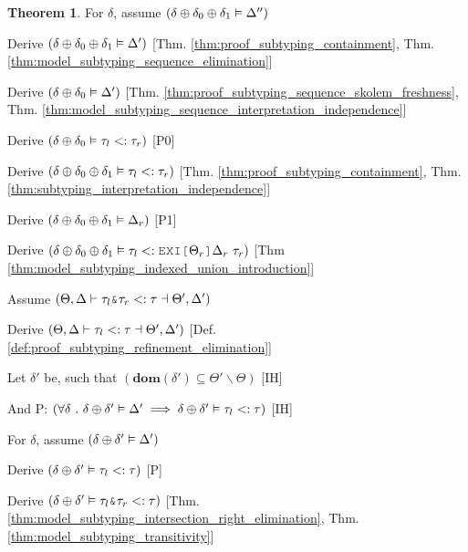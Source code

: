\documentclass[acmsmall]{acmart}
\theoremstyle{definition}
\newtheorem{theorem}{Theorem}[section]
\begin{document}
\begin{theorem}
  \item \I \N For $\delta$, assume $(
    \delta \oplus \delta_0 \oplus \delta_1 \vDash \Delta''
  )$


  \item \I\I \N Derive $(
    \delta \oplus \delta_0 \oplus \delta_1 \vDash \Delta'
  )$ [Thm. \ref{thm:proof_subtyping_containment}, Thm. \ref{thm:model_subtyping_sequence_elimination}]
  \item \I\I \N Derive $(
    \delta \oplus \delta_0 \vDash \Delta'
  )$ [Thm. \ref{thm:proof_subtyping_sequence_skolem_freshness}, Thm. \ref{thm:model_subtyping_sequence_interpretation_independence}]
  \item \I\I \N Derive $(
    \delta \oplus \delta_0 \vDash \tau_l <: \tau_r
  )$ [P0]


  \item \I\I \N Derive $(
    \delta \oplus \delta_0 \oplus \delta_1 \vDash \tau_l <: \tau_r
  )$ [Thm. \ref{thm:proof_subtyping_containment}, Thm. \ref{thm:subtyping_interpretation_independence}]


  \item \I\I \N Derive $(
    \delta \oplus \delta_0 \oplus \delta_1 \vDash \Delta_r
  )$ [P1]

  \item \I\I \N Derive $(
    \delta \oplus \delta_0 \oplus \delta_1 \satisfies \tau_l \subtypes \J{EXI[}\Theta_r\J{]}\Delta_r\ \tau_r
  )$ [Thm \ref{thm:model_subtyping_indexed_union_introduction}]


  \item \N Assume $(
    \Theta, \Delta \entails \tau_{l}\J{\&}\tau_{r}  \subtypes \tau \given \Theta', \Delta' 
  )$
  \item \I \N Derive $(
    \Theta, \Delta \vdash \tau_{l} <: \tau \dashv \Theta', \Delta'
  )$ [Def. \ref{def:proof_subtyping_refinement_elimination}]

  \item \I \N Let $\delta'$ be, such that $(
    \textbf{dom}(\delta') \subseteq \Theta' \backslash \Theta
  )$ [IH]
  \item \I \N And P: $(
    \forall \delta \ .\  
    \delta \oplus \delta' \vDash \Delta' 
    \implies 
    \delta \oplus \delta' \vDash \tau_l <: \tau
  )$ [IH]
  \item \I \N For $\delta$, 
    assume $(\delta \oplus \delta' \vDash \Delta')$
  \item \I\I \N Derive $(
    \delta \oplus \delta' \vDash \tau_l <: \tau
  )$ [P]
  \item \I\I \N Derive $(
    \delta \oplus \delta' \satisfies \tau_l \J{\&} \tau_r \subtypes \tau 
  )$ [Thm. \ref{thm:model_subtyping_intersection_right_elimination}, Thm. \ref{thm:model_subtyping_transitivity}]


\end{theorem}
\end{document}
